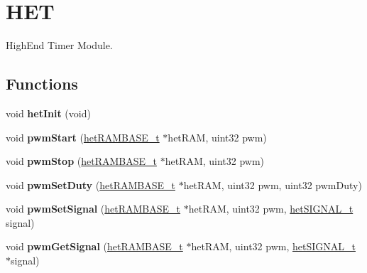 \hypertarget{group__HET}{}\section{H\+ET}
\label{group__HET}


High\+End Timer Module.  


\subsection*{Functions}
\begin{DoxyCompactItemize}
\item 
\mbox{\label{group__HET_ga792201a5a958f5563410a899c3689ce4}} 
void {\bfseries het\+Init} (void)
\item 
\mbox{\label{group__HET_gaad125e21ca189caa6fdc150620381309}} 
void {\bfseries pwm\+Start} (\mbox{\hyperlink{reg__het_8h_aff6a3de4d5a894a32134243e0d87bb32}{het\+R\+A\+M\+B\+A\+S\+E\+\_\+t}} $\ast$het\+R\+AM, uint32 pwm)
\item 
\mbox{\label{group__HET_gad12cc4bad2851e18fce9267a6f92f2a7}} 
void {\bfseries pwm\+Stop} (\mbox{\hyperlink{reg__het_8h_aff6a3de4d5a894a32134243e0d87bb32}{het\+R\+A\+M\+B\+A\+S\+E\+\_\+t}} $\ast$het\+R\+AM, uint32 pwm)
\item 
\mbox{\label{group__HET_ga432cdaf586d5140227d89f3ace0c7dd3}} 
void {\bfseries pwm\+Set\+Duty} (\mbox{\hyperlink{reg__het_8h_aff6a3de4d5a894a32134243e0d87bb32}{het\+R\+A\+M\+B\+A\+S\+E\+\_\+t}} $\ast$het\+R\+AM, uint32 pwm, uint32 pwm\+Duty)
\item 
\mbox{\label{group__HET_gaf19e0a2a99b1ce83f4a8446da7e65ebb}} 
void {\bfseries pwm\+Set\+Signal} (\mbox{\hyperlink{reg__het_8h_aff6a3de4d5a894a32134243e0d87bb32}{het\+R\+A\+M\+B\+A\+S\+E\+\_\+t}} $\ast$het\+R\+AM, uint32 pwm, \mbox{\hyperlink{het_8h_a87f46a75dd7fcc91f1664567ea27ea14}{het\+S\+I\+G\+N\+A\+L\+\_\+t}} signal)
\item 
\mbox{\label{group__HET_ga30eac975d9c173da8b5266205a6fe9c7}} 
void {\bfseries pwm\+Get\+Signal} (\mbox{\hyperlink{reg__het_8h_aff6a3de4d5a894a32134243e0d87bb32}{het\+R\+A\+M\+B\+A\+S\+E\+\_\+t}} $\ast$het\+R\+AM, uint32 pwm, \mbox{\hyperlink{het_8h_a87f46a75dd7fcc91f1664567ea27ea14}{het\+S\+I\+G\+N\+A\+L\+\_\+t}} $\ast$signal)

\end{DoxyCompactItemize}
